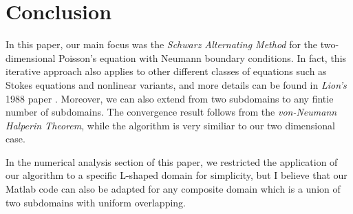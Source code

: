 \chapter{Conclusion}\label{chapt:conclusion}
In this paper, our main focus was the \emph{Schwarz Alternating Method} for the two-dimensional Poisson's equation with Neumann boundary conditions. In fact, this iterative approach also applies to other different classes of equations such as Stokes equations and nonlinear variants, and more details can be found in \emph{Lion's} 1988 paper \cite{PL88}. Moreover, we can also extend from two subdomains to any fintie number of subdomains. The convergence result follows from the  \emph{von-Neumann Halperin Theorem}, while the algorithm is very similiar to our two dimensional case.

In the numerical analysis section of this paper, we restricted the application of our algorithm to a specific L-shaped domain for simplicity, but I believe that our  Matlab code can also be adapted for any composite domain which is a union of two subdomains with uniform overlapping.



